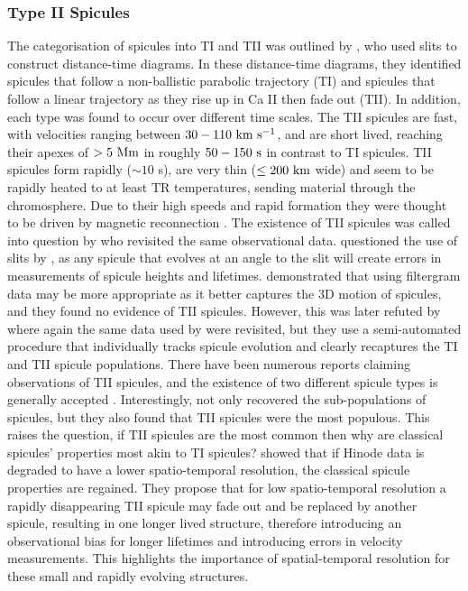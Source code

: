 \subsubsection{Type II Spicules}
\label{subsec:TII}
The categorisation of spicules into TI and TII was outlined by \cite{Pontieu2007PASJ}, who used slits to construct distance-time diagrams. In these distance-time diagrams, they identified spicules that follow a non-ballistic parabolic trajectory (TI) and spicules that follow a linear trajectory as they rise up in Ca II then fade out (TII). In addition, each type was found to occur over different time scales. The TII spicules are fast, with velocities ranging between $30-110~\rm{km ~s^{-1}}$, and are short lived, reaching their apexes of $>5~\rm{Mm}$ in roughly $50-150~\rm{s}$ in contrast to TI spicules. TII spicules form rapidly ($\sim 10$ s), are very thin ($\leq 200~\rm{km}$ wide) and seem to be rapidly heated to at least TR temperatures, sending material through the chromosphere. Due to their high speeds and rapid formation they were thought to be driven by magnetic reconnection \citep{Pontieu2007PASJ}. The existence of TII spicules was called into question by \cite{Zhang2012ApJ} who revisited the same observational data. \cite{Zhang2012ApJ} questioned the use of slits by \cite{Pontieu2007PASJ}, as any spicule that evolves at an angle to the slit will create errors in measurements of spicule heights and lifetimes. \cite{Zhang2012ApJ} demonstrated that using filtergram data may be more appropriate as it better captures the 3D motion of spicules, and they found no evidence of TII spicules. However, this was later refuted by \cite{Pereira2012} where again the same data used by \cite{Pontieu2007PASJ} were revisited, but they use a semi-automated procedure that individually tracks spicule evolution and clearly recaptures the TI and TII spicule populations. There have been numerous reports claiming observations of TII spicules, and the existence of two different spicule types is generally accepted \citep{Rouppe2009ApJ, Rouppe2015ApJ799L3R, Shetye2016AA589A3S, Rutten2019AA632A96R, Yurchyshyn2020ApJ891L21Y, Chintzoglou2021ApJ90682C}. \np   
%
Interestingly, \cite{Pereira2012} not only recovered the sub-populations of spicules, but they also found that TII spicules were the most populous. This raises the question, if TII spicules are the most common then why are classical spicules' properties most akin to TI spicules? \cite{Pereira2013ApJ76469P} showed that if Hinode data is degraded to have a lower spatio-temporal resolution, the classical spicule properties are regained. They propose that for low spatio-temporal resolution a rapidly disappearing TII spicule may fade out and be replaced by another spicule, resulting in one longer lived structure, therefore introducing an observational bias for longer lifetimes and introducing errors in velocity measurements. This highlights the importance of spatial-temporal resolution for these small and rapidly evolving structures.\np
